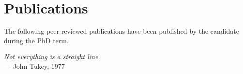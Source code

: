 
{}
\chapter*{Publications}

\manualmark
{}

\noindent The following peer-reviewed publications have been published by the candidate during the PhD term.
%
\begin{refsection}
    \nocite{*} %
    \printbibliography[heading=none,keyword=own]
\end{refsection}

\begin{flushright}{\slshape
    Not everything is a straight line.} \\ \medskip
    --- John Tukey, 1977
\end{flushright}

\vfill

